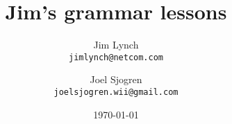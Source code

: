 \documentclass[a4paper]{memoir}
\begin{document}
\title{Jim's grammar lessons}
\author{
  Jim Lynch\\
  \texttt{jimlynch@netcom.com}
  \and
  Joel Sjogren\\
  \texttt{joelsjogren.wii@gmail.com}
}
\date{\today}
\maketitle


\renewcommand{\labelitemi}{$\circ$}





\end{document}
